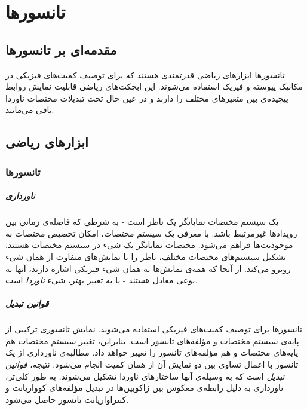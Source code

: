 
\chapter{تانسورها}

\section{مقدمه‌ای بر تانسورها}

تانسورها ابزارهای ریاضی قدرتمندی هستند که برای توصیف کمیت‌های فیزیکی در مکانیک پیوسته و فیزیک استفاده می‌شوند. این ابجکت‌های ریاضی قابلیت نمایش روابط پیچیده‌ی بین متغیرهای مختلف را دارند و در عین حال تحت تبدیلات مختصات ناوردا باقی می‌مانند.

\section{ابزارهای ریاضی}

\subsection{تانسورها}

\paragraph{ناورداری} یک سیستم مختصات نمایانگر یک ناظر است - به شرطی که فاصله‌ی زمانی بین رویدادها غیرمرتبط باشد. با معرفی یک سیستم مختصات، امکان تخصیص مختصات به موجودیت‌ها فراهم می‌شود. مختصات نمایانگر یک شیء در سیستم مختصات هستند. تشکیل سیستم‌های مختصات مختلف، ناظر را با نمایش‌های متفاوت از همان شیء روبرو می‌کند. از آنجا که همه‌ی نمایش‌ها به همان شیء فیزیکی اشاره دارند، آنها به نوعی معادل هستند - یا به تعبیر بهتر، شیء \textit{ناوردا} است.

\paragraph{قوانین تبدیل} تانسورها برای توصیف کمیت‌های فیزیکی استفاده می‌شوند. نمایش تانسوری ترکیبی از پایه‌ی سیستم مختصات و مؤلفه‌های تانسور است. بنابراین، تغییر سیستم مختصات هم پایه‌های مختصات و هم مؤلفه‌های تانسور را تغییر خواهد داد. مطالبه‌ی ناورداری از یک تانسور با اعمال تساوی بین دو نمایش آن از همان کمیت انجام می‌شود. نتیجه، \textit{قوانین تبدیل} است که به وسیله‌ی آنها ساختارهای ناوردا تشکیل می‌شوند. به طور کلی‌تر، ناورداری به دلیل رابطه‌ی معکوس بین ژاکوبین‌ها در تبدیل مؤلفه‌های کوواریانت و کنتراواریانت تانسور حاصل می‌شود.

